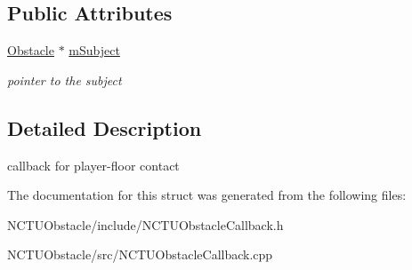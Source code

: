 \subsection*{Public Attributes}
\begin{DoxyCompactItemize}
\item 
\hyperlink{class_n_c_t_u_1_1_obstacle}{Obstacle} $\ast$ \hyperlink{struct_n_c_t_u_1_1_floor_contact_result_callback_a87b90c0dadbb358e7e3f080adb4202e1}{m\+Subject}\hypertarget{struct_n_c_t_u_1_1_floor_contact_result_callback_a87b90c0dadbb358e7e3f080adb4202e1}{}\label{struct_n_c_t_u_1_1_floor_contact_result_callback_a87b90c0dadbb358e7e3f080adb4202e1}

\begin{DoxyCompactList}\small\item\em pointer to the subject \end{DoxyCompactList}\end{DoxyCompactItemize}


\subsection{Detailed Description}
callback for player-\/floor contact 

The documentation for this struct was generated from the following files\+:\begin{DoxyCompactItemize}
\item 
N\+C\+T\+U\+Obstacle/include/N\+C\+T\+U\+Obstacle\+Callback.\+h\item 
N\+C\+T\+U\+Obstacle/src/N\+C\+T\+U\+Obstacle\+Callback.\+cpp\end{DoxyCompactItemize}
